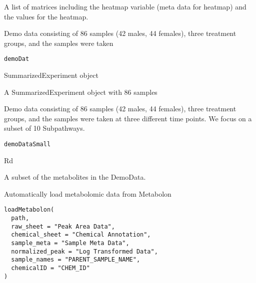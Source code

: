 \documentclass[a4paper]{book}
\begin{document}
%
\begin{Value}
A list of matrices including the heatmap variable
(meta data for heatmap)
and the values for the heatmap.
\end{Value}
%
\begin{Description}
Demo data consisting of 86 samples (42 males, 44 females), three treatment
groups, and the samples were taken
\end{Description}
%
\begin{Usage}
\begin{verbatim}
demoDat
\end{verbatim}
\end{Usage}
%
\begin{Format}
SummarizedExperiment object
\end{Format}
%
\begin{Value}
A SummarizedExperiment object with 86 samples
\end{Value}
%
\begin{Description}
Demo data consisting of 86 samples (42 males, 44 females), three treatment
groups, and the samples were taken at three different time points.
We focus on a subset of 10 Subpathways.
\end{Description}
%
\begin{Usage}
\begin{verbatim}
demoDataSmall
\end{verbatim}
\end{Usage}
%
\begin{Format}
Rd
\end{Format}
%
\begin{Value}
A subset of the metabolites in the DemoData.
\end{Value}
%
\begin{Description}
Automatically load metabolomic data from Metabolon
\end{Description}
%
\begin{Usage}
\begin{verbatim}
loadMetabolon(
  path,
  raw_sheet = "Peak Area Data",
  chemical_sheet = "Chemical Annotation",
  sample_meta = "Sample Meta Data",
  normalized_peak = "Log Transformed Data",
  sample_names = "PARENT_SAMPLE_NAME",
  chemicalID = "CHEM_ID"
)
\end{verbatim}
\end{Usage}
\end{document}
